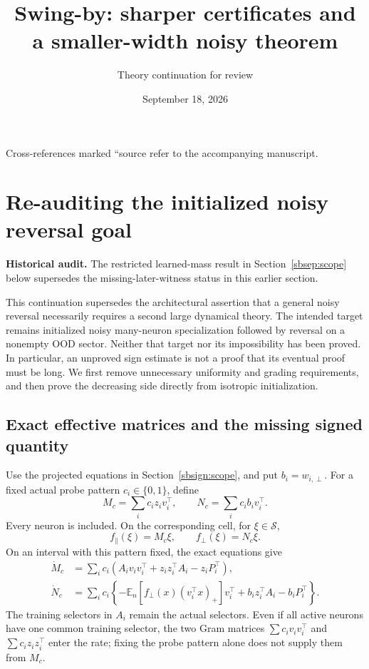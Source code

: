 \documentclass[11pt]{article}
\title{Swing-by: sharper certificates and a smaller-width noisy theorem}
\author{Theory continuation for review}
\date{September 18, 2026}
\theoremstyle{remark}
\begin{document}
\maketitle
\hypertarget{source-anchor}{Cross-references marked ``source refer to the accompanying manuscript.}
\section{Re-auditing the initialized noisy reversal goal}
\label{sbaudit:scope}
\textbf{Historical audit.} The restricted learned-mass result in Section~\ref{sbsep:scope} below supersedes the missing-later-witness status in this earlier section.

This continuation supersedes the architectural assertion that a general noisy
reversal necessarily requires a second large dynamical theory. The intended
target remains initialized noisy many-neuron specialization followed by
reversal on a nonempty OOD sector. Neither that target nor its impossibility
has been proved. In particular, an unproved sign estimate is not a proof that
its eventual proof must be long. We first remove unnecessary uniformity and
grading requirements, and then prove the decreasing side directly from
isotropic initialization.

\subsection{Exact effective matrices and the missing signed quantity}

Use the projected equations in Section~\ref{sbsign:scope}, and put
$b_i=w_{i,\perp}$. For a fixed actual probe pattern $c_i\in\{0,1\}$,
define
\[
 M_c=\sum_i c_i z_iv_i^\top,\qquad
 N_c=\sum_i c_i b_iv_i^\top.
\]
Every neuron is included. On the corresponding cell, for $\xi\in\mathcal S$,
\begin{equation}\label{sbaudit:cell}
 f_\parallel(\xi)=M_c\xi,\qquad f_\perp(\xi)=N_c\xi.
\end{equation}
On an interval with this pattern fixed, the exact equations give
\begin{align}
 \dot M_c&=\sum_i c_i
 (A_iv_iv_i^\top+z_iz_i^\top A_i-z_iP_i^\top),
 \label{sbaudit:matrix-rate}\\
 \dot N_c&=\sum_i c_i
 \left\{-\mathbb E_n[f_\perp(x)(v_i^\top x)_+]v_i^\top
           +b_iz_i^\top A_i-b_iP_i^\top\right\}.
 \label{sbaudit:ambient-rate}
\end{align}
The training selectors in $A_i$ remain the actual selectors. Even if all
active neurons have one common training selector, the two Gram matrices
$\sum c_i v_iv_i^\top$ and $\sum c_i z_iz_i^\top$ enter the rate; fixing
the probe pattern alone does not supply them from $M_c$.
\end{document}
